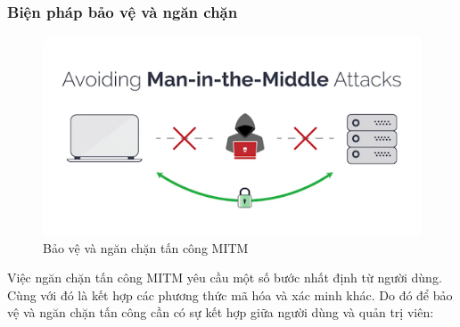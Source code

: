 \subsubsection{Biện pháp bảo vệ và ngăn chặn}
\begin{figure}[H]
    \centering
    \includegraphics[scale=0.8]{pic/huê/tấn công mitm.png}
    
    \caption{Bảo vệ và ngăn chặn tấn công MITM}
\end{figure}
Việc ngăn chặn tấn công MITM yêu cầu một số bước nhất định từ người dùng. Cùng với đó là kết hợp các phương thức mã hóa và xác minh khác. Do đó để bảo vệ và ngăn chặn tấn công cần có sự kết hợp giữa người dùng và quản trị viên:
